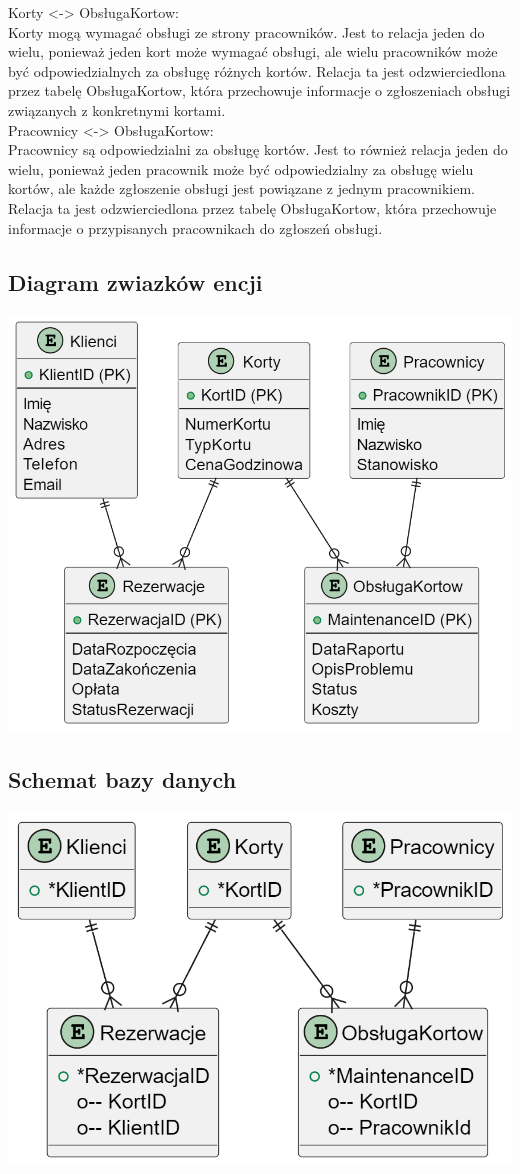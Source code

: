 \documentclass{article}
\begin{document}
\noindent
Korty <-> ObsługaKortow:\\
Korty mogą wymagać obsługi ze strony pracowników. Jest to relacja jeden do wielu, ponieważ jeden kort może wymagać obsługi, ale wielu pracowników może być odpowiedzialnych za obsługę różnych kortów. Relacja ta jest odzwierciedlona przez tabelę ObsługaKortow, która przechowuje informacje o zgłoszeniach obsługi związanych z konkretnymi kortami.\\

\noindent
Pracownicy <-> ObsługaKortow:\\
Pracownicy są odpowiedzialni za obsługę kortów. Jest to również relacja jeden do wielu, ponieważ jeden pracownik może być odpowiedzialny za obsługę wielu kortów, ale każde zgłoszenie obsługi jest powiązane z jednym pracownikiem. Relacja ta jest odzwierciedlona przez tabelę ObsługaKortow, która przechowuje informacje o przypisanych pracownikach do zgłoszeń obsługi.\\


\subsection*{Diagram zwiazków encji}
\includegraphics[trim=0 0 0 0,clip,width=\linewidth]{diagram-zwiazkow-encji.png}


\subsection*{Schemat bazy danych}
\includegraphics[trim=0 0 0 0,clip,width=\linewidth]{schemat-bazy-danych.png}
\end{document}
